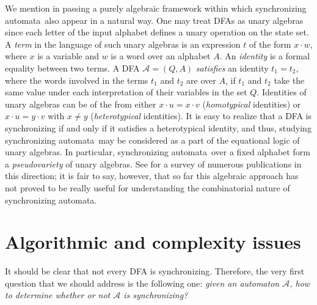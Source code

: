 \documentclass{irmaart}
\newcommand{\sa}{synchronizing au\-tom\-a\-ta}
\theoremstyle{plain}
\begin{document}
We mention in passing a purely algebraic framework within which \sa\ also appear in a natural way. One may treat DFAs
as unary algebras since each letter of the input alphabet defines a unary
operation on the state set. A \emph{term} in the language of
such unary algebras is an expression $t$ of the form $x\cdot w$, where $x$ is a
variable and $w$ is a word over an alphabet $A$. An
\emph{identity} is a formal equality between
two terms. A DFA $\mathcal{A}=(Q,A)$ \emph{satisfies} an identity $t_1=t_2$,
where the words involved in the terms $t_1$ and $t_2$ are over $A$, if $t_1$
and $t_2$ take the same value under each interpretation of their variables in
the set $Q$. Identities of unary algebras can be of the from either $x\cdot
u=x\cdot v$ (\emph{homotypical} identities) or $x\cdot u=y\cdot v$ with $x\ne y$
(\emph{heterotypical} identities). It is easy to realize that a DFA is synchronizing if
and only if it satisfies a heterotypical identity, and thus, studying \sa\ may
be considered as a part of the equational logic of unary algebras. In
particular, \sa\ over a fixed alphabet form a \emph{pseudovariety} of unary
algebras. See \cite{Bogdanovic&Imreh&Ciric&Petkovic:1999} for a survey of
numerous publications in this direction; it is fair to say, however, that so
far this algebraic approach has not proved to be really useful for
understanding the combinatorial nature of \sa.

\section{Algorithmic and complexity issues}
\label{KV:sec:algorithms&complexity}
It should be clear that not every DFA is synchronizing. Therefore, the very
first question that we should address is the following one: \emph{given an
automaton $\mathcal{A}$, how to determine whether or not $\mathcal{A}$ is
synchronizing?}
\end{document}
